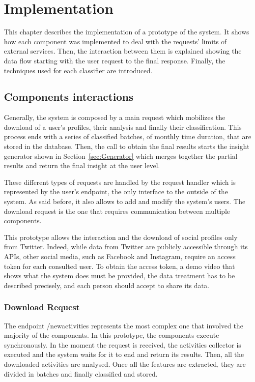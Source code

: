 \chapter{Implementation}
This chapter describes the implementation of a prototype of the system.
It shows how each component was implemented to deal with the requests' limits of external services.
Then, the interaction between them is explained showing the data flow starting with the user request to the final response.
Finally, the techniques used for each classifier are introduced.

\section{Components interactions}
Generally, the system is composed by a main request which mobilizes the download of a user's profiles, their analysis and finally their classification.
This process ends with a series of classified batches, of monthly time duration, that are stored in the database.
Then, the call to obtain the final results starts the insight generator shown in Section~\ref{sec:Generator} which merges together the partial results and return the final insight at the user level.

These different types of requests are handled by the request handler which is represented by the user's endpoint, the only interface to the outside of the system.
As said before, it also allows to add and modify the system's users.
The download request is the one that requires communication between multiple components.

This prototype allows the interaction and the download of social profiles only from Twitter.
Indeed, while data from Twitter are publicly accessible through its APIs, other social media, such as Facebook and Instagram, require an access token for each consulted user.
To obtain the access token, a demo video that shows what the system does must be provided, the data treatment has to be described precisely, and each person should accept to share its data.
\subsection{Download Request}
\label{sec:downloadRequ}
The endpoint /newactivities represents the most complex one that involved the majority of the components.
In this prototype, the components execute synchronously. In the moment the request is received, the activities collector is executed and the system waits for it to end and return its results.
Then, all the downloaded activities are analysed. Once all the features are extracted, they are divided in batches and finally classified and stored.

